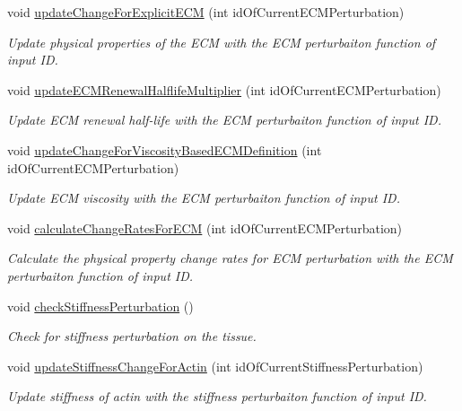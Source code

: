 \begin{DoxyCompactItemize}
void \hyperlink{classSimulation_af0d9108d648996ef65a3eff0977a8590}{update\+Change\+For\+Explicit\+E\+C\+M} (int id\+Of\+Current\+E\+C\+M\+Perturbation)
\begin{DoxyCompactList}\small\item\em Update physical properties of the E\+C\+M with the E\+C\+M perturbaiton function of input I\+D. \end{DoxyCompactList}\item 
void \hyperlink{classSimulation_a2308c071a7f6260910d76d4a8604a0a3}{update\+E\+C\+M\+Renewal\+Halflife\+Multiplier} (int id\+Of\+Current\+E\+C\+M\+Perturbation)
\begin{DoxyCompactList}\small\item\em Update E\+C\+M renewal half-\/life with the E\+C\+M perturbaiton function of input I\+D. \end{DoxyCompactList}\item 
void \hyperlink{classSimulation_a6ac28dca8cca35baed5b75ce4f8062c8}{update\+Change\+For\+Viscosity\+Based\+E\+C\+M\+Definition} (int id\+Of\+Current\+E\+C\+M\+Perturbation)
\begin{DoxyCompactList}\small\item\em Update E\+C\+M viscosity with the E\+C\+M perturbaiton function of input I\+D. \end{DoxyCompactList}\item 
void \hyperlink{classSimulation_a405e565b21064979e0010286927d087a}{calculate\+Change\+Rates\+For\+E\+C\+M} (int id\+Of\+Current\+E\+C\+M\+Perturbation)
\begin{DoxyCompactList}\small\item\em Calculate the physical property change rates for E\+C\+M perturbation with the E\+C\+M perturbaiton function of input I\+D. \end{DoxyCompactList}\item 
void \hyperlink{classSimulation_a361530c38e215fd901d5e8a0ef051386}{check\+Stiffness\+Perturbation} ()
\begin{DoxyCompactList}\small\item\em Check for stiffness perturbation on the tissue. \end{DoxyCompactList}\item 
void \hyperlink{classSimulation_aacaebdb527784f46f67232f3180936e1}{update\+Stiffness\+Change\+For\+Actin} (int id\+Of\+Current\+Stiffness\+Perturbation)
\begin{DoxyCompactList}\small\item\em Update stiffness of actin with the stiffness perturbaiton function of input I\+D. \end{DoxyCompactList}\item 

\end{DoxyCompactItemize}
